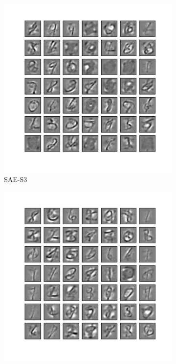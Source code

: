 \begin{figure}
\begin{subfigure}[t]{0.4\textwidth}
	\end{subfigure}\\
	\begin{subfigure}[t]{0.4\textwidth}
		\includegraphics[width=\textwidth]{pics_sdlm/41_MNIST_SAE_teach/2_60000_0.pdf}
		\caption{SAE-S3}
	\end{subfigure}
	\begin{subfigure}[t]{0.4\textwidth}
		\includegraphics[width=\textwidth]{pics_sdlm/43_MNIST_SAE_all/2_60000_0.pdf}

\end{subfigure}
\end{figure}
